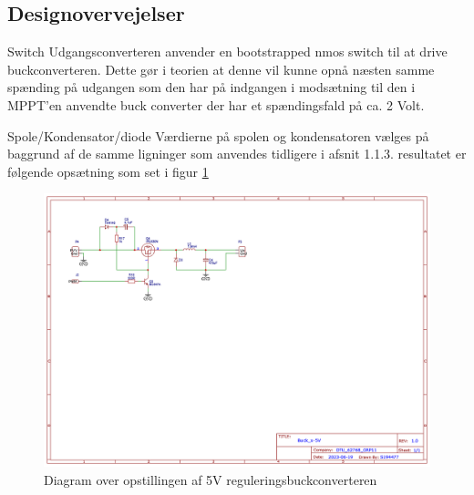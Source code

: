 \documentclass[../main.tex]{subfiles}
\begin{document}
    \subsection{Designovervejelser}
        
        Switch
        Udgangsconverteren anvender en bootstrapped nmos switch til at drive buckconverteren. Dette gør i teorien at denne vil kunne opnå næsten samme spænding på udgangen som den har på indgangen i modsætning til den i MPPT'en anvendte buck converter der har et spændingsfald på ca. 2 Volt.
        
        Spole/Kondensator/diode
        Værdierne på spolen og kondensatoren vælges på baggrund af de samme ligninger som anvendes tidligere i afsnit 1.1.3.\newline
        resultatet er følgende opsætning som set i figur \ref{fig: 5V buck PV}
        
        \begin{figure}[H]
            \includegraphics[width=\textwidth]{Dokumentation/Figures/PV_Buck_x-5V.png}
            \caption{Diagram over opstillingen af 5V reguleringsbuckconverteren}
            \label{fig: 5V buck PV}
        \end{figure}

            
\end{document}
